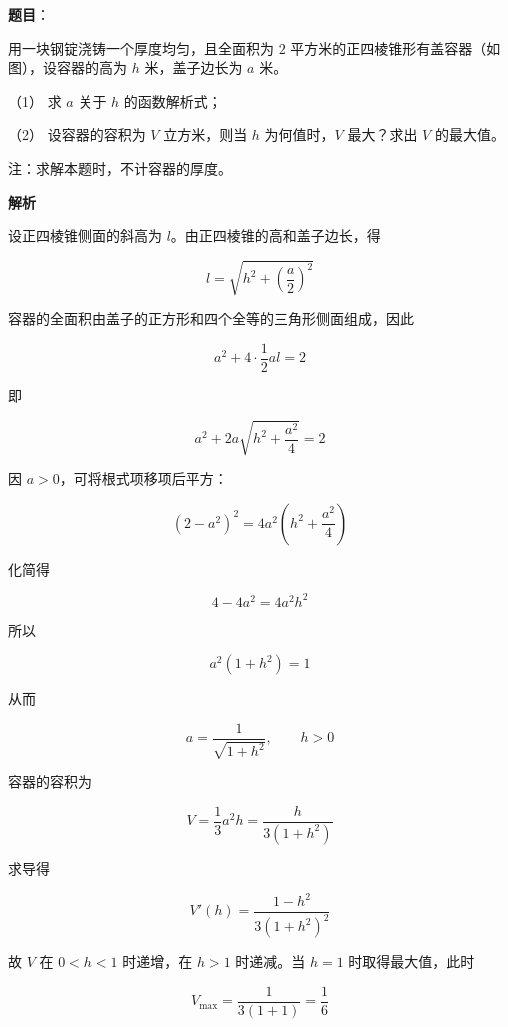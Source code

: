 \begin{answer}

\textbf{题目}：

用一块钢锭浇铸一个厚度均匀，且全面积为 $2$ 平方米的正四棱锥形有盖容器（如图），设容器的高为 $h$ 米，盖子边长为 $a$ 米。
\nopagebreak[4]
\begin{center}\end{center}
\nopagebreak[4]
（1） 求 $a$ 关于 $h$ 的函数解析式；

（2） 设容器的容积为 $V$ 立方米，则当 $h$ 为何值时，$V$ 最大？求出 $V$ 的最大值。

注：求解本题时，不计容器的厚度。

\textbf{解析}


设正四棱锥侧面的斜高为 $l$。由正四棱锥的高和盖子边长，得

\nopagebreak[4]
\[
l=\sqrt{h^2+\left(\frac a2\right)^2}
\]

容器的全面积由盖子的正方形和四个全等的三角形侧面组成，因此

\nopagebreak[4]
\[
a^2+4\cdot\frac12al=2
\]

即

\nopagebreak[4]
\[
a^2+2a\sqrt{h^2+\frac{a^2}{4}}=2
\]

因 $a>0$，可将根式项移项后平方：

\nopagebreak[4]
\[
(2-a^2)^2
=4a^2\left(h^2+\frac{a^2}{4}\right)
\]

化简得

\nopagebreak[4]
\[
4-4a^2=4a^2h^2
\]

所以

\nopagebreak[4]
\[
a^2(1+h^2)=1
\]

从而

\nopagebreak[4]
\[
a=\frac1{\sqrt{1+h^2}},\qquad h>0
\]


容器的容积为

\nopagebreak[4]
\[
V=\frac13a^2h
=\frac{h}{3(1+h^2)}
\]

求导得

\nopagebreak[4]
\[
V'(h)=\frac{1-h^2}{3(1+h^2)^2}
\]

故 $V$ 在 $0<h<1$ 时递增，在 $h>1$ 时递减。当 $h=1$ 时取得最大值，此时

\nopagebreak[4]
\[
V_{\max}=\frac1{3(1+1)}=\frac16
\]



\end{answer}
